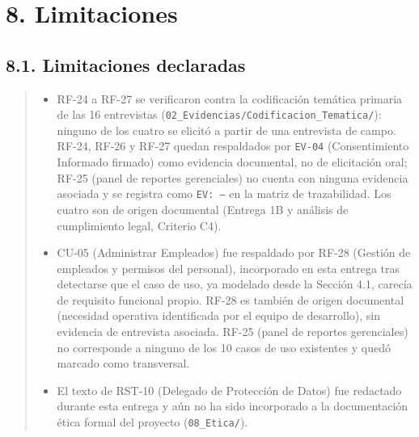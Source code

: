 \documentclass[
]{article}
\begin{document}
\section{8. Limitaciones }\label{limitaciones-trabajo-pendiente}
\subsection{8.1. Limitaciones declaradas}\label{s7-3-limitaciones-declaradas}
\begin{quote}
\begin{itemize}
  \item RF-24 a RF-27 se verificaron contra la codificación temática
  primaria de las 16 entrevistas
  (\texttt{02\_Evidencias/Codificacion\_Tematica/}): ninguno de los
  cuatro se elicitó a partir de una entrevista de campo. RF-24, RF-26
  y RF-27 quedan respaldados por \texttt{EV-04} (Consentimiento
  Informado firmado) como evidencia documental, no de elicitación
  oral; RF-25 (panel de reportes gerenciales) no cuenta con ninguna
  evidencia asociada y se registra como \texttt{EV: ---} en la matriz
  de trazabilidad. Los cuatro son de origen documental (Entrega 1B y
  análisis de cumplimiento legal, Criterio C4).
  \item CU-05 (Administrar Empleados) fue respaldado por RF-28
  (Gestión de empleados y permisos del personal), incorporado en esta
  entrega tras detectarse que el caso de uso, ya modelado desde la
  Sección 4.1, carecía de requisito funcional propio. RF-28 es también
  de origen documental (necesidad operativa identificada por el equipo
  de desarrollo), sin evidencia de entrevista asociada. RF-25 (panel de
  reportes gerenciales) no corresponde a ninguno de los 10 casos de uso
  existentes y quedó marcado como transversal.
  \item El texto de RST-10 (Delegado de Protección de Datos) fue
  redactado durante esta entrega y aún no ha sido incorporado a la
  documentación ética formal del proyecto (\texttt{08\_Etica/}).
\end{itemize}
\end{quote}
\end{document}
